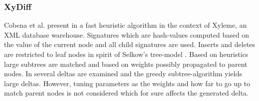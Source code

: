 \subsubsection{XyDiff\cite{cobena2002detecting}}
Cobena et al. present in \cite{cobena2002detecting} a fast heuristic algorithm in the context of Xyleme, an XML database warehouse. %
Signatures which are hash-values computed based on the value of the current node and all child signatures are used. Inserts and deletes are restricted to leaf nodes in spirit of Selkow's tree-model \cite{tai1979tree}. Based on heuristics large subtrees are matched and based on weights possibly propagated to parent nodes. In \cite{ronnau2009efficient} several deltas are examined and the greedy subtree-algorithm yields large deltas. However, tuning parameters as the weights and how far to go up to match parent nodes is not considered which for sure affects the generated delta. 


